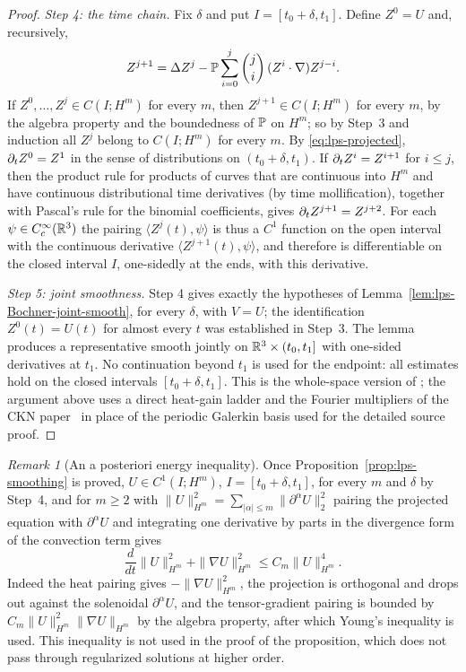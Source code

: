 \documentclass[11pt,letterpaper]{article}
\numberwithin{equation}{section}
\theoremstyle{plain}
\theoremstyle{definition}
\theoremstyle{remark}
\newtheorem{remark}[theorem]{Remark}
\begin{document}
\begin{proof}
\emph{Step 4: the time chain.} Fix $\delta$ and put $I=[t_0+\delta,t_1]$. Define
$Z^0=U$ and, recursively,
\[
Z^{j+1}=\Delta Z^j-\mathbb{P}\sum_{i=0}^{j}\binom ji
\,(Z^i\cdot\nabla)Z^{j-i}.
\]
If $Z^0,\dots,Z^j\in C(I;H^m)$ for every $m$, then $Z^{j+1}\in C(I;H^m)$ for
every $m$, by the algebra property and the boundedness of $\mathbb{P}$ on $H^m$;
so by Step~3 and induction all $Z^j$ belong to $C(I;H^m)$ for every $m$.
By \eqref{eq:lps-projected}, $\partial_t Z^0=Z^1$ in the sense of distributions on
$(t_0+\delta,t_1)$. If $\partial_t Z^i=Z^{i+1}$ for $i\le j$, then the product rule
for products of curves that are continuous into $H^m$ and have continuous
distributional time derivatives (by time mollification), together with
Pascal's rule for the binomial coefficients, gives $\partial_t Z^{j+1}=Z^{j+2}$. For
each $\psi\in C_c^\infty(\mathbb{R}^3)$ the pairing $\langle Z^j(t),\psi\rangle$ is
thus a $C^1$ function on the open interval with the continuous derivative
$\langle Z^{j+1}(t),\psi\rangle$, and therefore is differentiable on the closed
interval $I$, one-sidedly at the ends, with this derivative.

\emph{Step 5: joint smoothness.} Step 4 gives exactly the hypotheses of
Lemma~\ref{lem:lps-Bochner-joint-smooth}, for every $\delta$, with
$V=U$; the identification $Z^0(t)=U(t)$ for almost every $t$ was
established in Step~3. The lemma produces a representative smooth jointly on
$\mathbb{R}^3\times(t_0,t_1]$ with one-sided derivatives at $t_1$. No continuation
beyond $t_1$ is used for the endpoint: all estimates hold on the closed
intervals $[t_0+\delta,t_1]$.
This is the whole-space version of
\cite[Theorems~7.1, 7.3 and 7.5, printed pp.~149--154]{RobinsonRodrigoSadowski2016};
the argument above uses a direct heat-gain ladder and the Fourier
multipliers of the CKN paper~\cite{CKNLean} in place of the periodic Galerkin basis used for the
detailed source proof.
\end{proof}

\begin{remark}[An a posteriori energy inequality]\label{rem:lps-Hm-energy}
Once Proposition~\ref{prop:lps-smoothing} is proved, $U\in C^1(I;H^m)$, $I=[t_0+\delta,t_1]$, for
every $m$ and $\delta$ by Step~4, and for $m\ge2$ with
$\|U\|_{H^m}^2=\sum_{|\alpha|\le m}\|\partial^\alpha U\|_2^2$ pairing the
projected equation with $\partial^\alpha U$ and integrating one derivative by
parts in the divergence form of the convection term gives
\begin{equation}\label{eq:lps-Hm-energy}
\frac{d}{dt}\|U\|_{H^m}^2+\|\nabla U\|_{H^m}^2\le C_m\|U\|_{H^m}^4 .
\end{equation}
Indeed the heat pairing gives $-\|\nabla U\|_{H^m}^2$, the projection is
orthogonal and drops out against the solenoidal $\partial^\alpha U$, and
the tensor-gradient pairing is bounded by
$C_m\|U\|_{H^m}^2\|\nabla U\|_{H^m}$ by the algebra property, after which
Young's inequality is used. This inequality is not used in the proof of the
proposition, which does not pass through regularized solutions at higher
order.
\end{remark}
\end{document}
